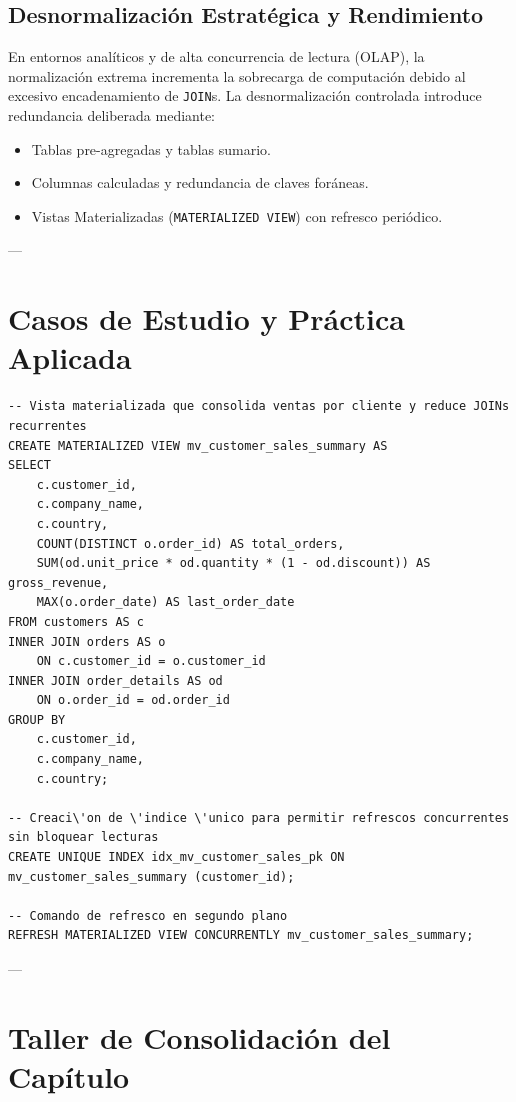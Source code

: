 \subsection{Desnormalizaci\'on Estrat\'egica y Rendimiento}
En entornos anal\'iticos y de alta concurrencia de lectura (OLAP), la normalizaci\'on extrema incrementa la sobrecarga de computaci\'on debido al excesivo encadenamiento de \texttt{JOIN}s. La desnormalizaci\'on controlada introduce redundancia deliberada mediante:
\begin{itemize}
    \item Tablas pre-agregadas y tablas sumario.
    \item Columnas calculadas y redundancia de claves for\'aneas.
    \item Vistas Materializadas (\texttt{MATERIALIZED VIEW}) con refresco peri\'odico.
\end{itemize}

---

\section{Casos de Estudio y Pr\'actica Aplicada}

\begin{lstlisting}[style=sqlstyle, caption={Implementaci\'on de Vistas Materializadas para desnormalizaci\'on anal\'itica}]
-- Vista materializada que consolida ventas por cliente y reduce JOINs recurrentes
CREATE MATERIALIZED VIEW mv_customer_sales_summary AS
SELECT
    c.customer_id,
    c.company_name,
    c.country,
    COUNT(DISTINCT o.order_id) AS total_orders,
    SUM(od.unit_price * od.quantity * (1 - od.discount)) AS gross_revenue,
    MAX(o.order_date) AS last_order_date
FROM customers AS c
INNER JOIN orders AS o
    ON c.customer_id = o.customer_id
INNER JOIN order_details AS od
    ON o.order_id = od.order_id
GROUP BY
    c.customer_id,
    c.company_name,
    c.country;

-- Creaci\'on de \'indice \'unico para permitir refrescos concurrentes sin bloquear lecturas
CREATE UNIQUE INDEX idx_mv_customer_sales_pk ON mv_customer_sales_summary (customer_id);

-- Comando de refresco en segundo plano
REFRESH MATERIALIZED VIEW CONCURRENTLY mv_customer_sales_summary;
\end{lstlisting}

---

\section{Taller de Consolidaci\'on del Cap\'itulo}

